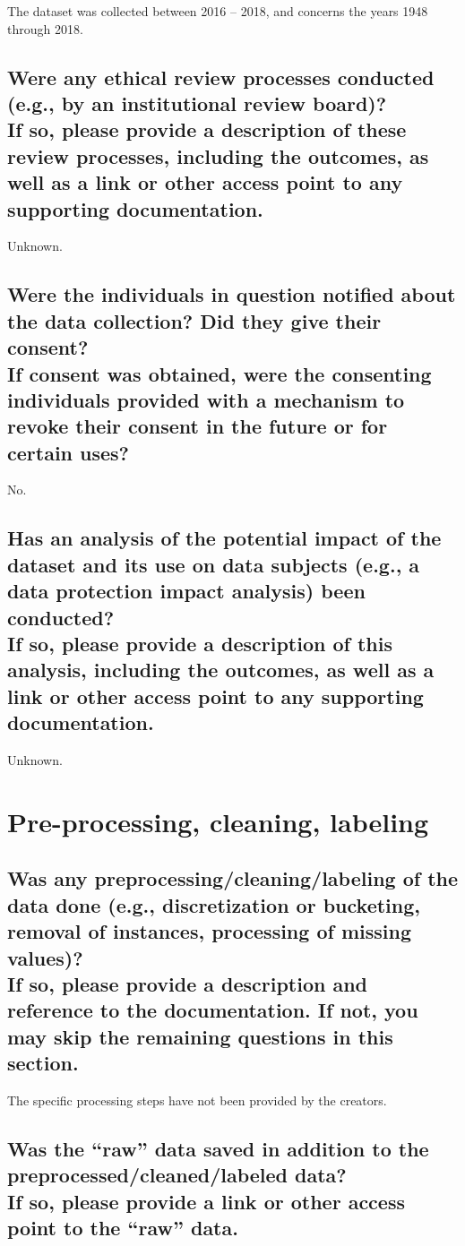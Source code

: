 \documentclass[letterpaper, 10 pt, conference]{ieeeconf}  %
\newcommand{\subtitle}[1]{{\\ \small \normalfont \color{purple} #1}}
\begin{document}
The dataset was collected between 2016 -- 2018, and concerns the years 1948 through 2018.

\subsection{Were any ethical review processes conducted (e.g., by an institutional review board)? \subtitle{If so, please provide a description of these review processes, including the outcomes, as well as a link or other access point to any supporting documentation.}}

Unknown.


\subsection{Were the individuals in question notified about the data collection? Did they give their consent? \subtitle{If consent was obtained, were the consenting individuals provided with a mechanism to revoke their consent in the future or for certain uses?}}

No.

\subsection{Has an analysis of the potential impact of the dataset and its use on data subjects (e.g., a data protection impact analysis) been conducted? \subtitle{If so, please provide a description of this analysis, including the outcomes, as well as a link or other access point to any supporting documentation.}}

Unknown.

\section{Pre-processing, cleaning, labeling}

\subsection{Was any preprocessing/cleaning/labeling of the data done (e.g., discretization or bucketing, removal of instances, processing of missing values)? \subtitle{If so, please provide a description and reference to the documentation. If not, you may skip the remaining questions in this section.}}

The specific processing steps have not been provided by the creators.

\subsection{Was the “raw” data saved in addition to the preprocessed/cleaned/labeled data? \subtitle{If so, please provide a link or other access point to the “raw” data. }}
\end{document}
